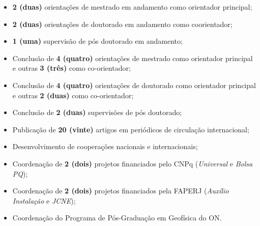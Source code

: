 \begin{itemize}
	\item[\parbox{0.03\textwidth}{\vspace{-0.1\baselineskip}\faSeedling}]
	\textbf{2 (duas)} orientações de mestrado em andamento como orientador principal;
	\item[\parbox{0.03\textwidth}{\vspace{-0.1\baselineskip}\faSeedling}]
	\textbf{2 (duas)} orientações de doutorado em andamento como coorientador;
	\item[\parbox{0.03\textwidth}{\vspace{-0.1\baselineskip}\faSeedling}]
	\textbf{1 (uma)} supervisão de pós doutorado em andamento;
	\item[\parbox{0.03\textwidth}{\vspace{-0.1\baselineskip}\faBaby}]
	Conclusão de \textbf{4 (quatro)} orientações de mestrado como orientador principal e outras \textbf{3 (três)} como co-orientador;
	\item[\parbox{0.03\textwidth}{\vspace{-0.1\baselineskip}\faChild}]
	Conclusão de \textbf{4 (quatro)} orientações de doutorado como orientador principal e outras \textbf{2 (duas)} como co-orientador;
	\item[\parbox{0.025\textwidth}{\vspace{-0.1\baselineskip}\faMale}]
	Conclusão de \textbf{2 (duas)} supervisões de pós doutorado;
	\item[\parbox{0.03\textwidth}{\vspace{-0.1\baselineskip}\faPencil*}]
	Publicação de \textbf{20 (vinte)} artigos em periódicos de circulação internacional;
	\item[\parbox{0.03\textwidth}{\vspace{-0.1\baselineskip}\faPeopleCarry}]
	Desenvolvimento de cooperações nacionais e internacionais;
	\item[\parbox{0.03\textwidth}{\vspace{-0.1\baselineskip}\aiIDEASRePEc}] 
	Coordenação de \textbf{2 (dois)} projetos financiados pelo CNPq
	(\textit{Universal} e \textit{Bolsa PQ});
	\item[\parbox{0.03\textwidth}{\vspace{-0.1\baselineskip}\aiIDEASRePEc}]
	Coordenação de \textbf{2 (dois)} projetos financiados pela FAPERJ
	(\textit{Auxílio Instalação} e \textit{JCNE});
	\item[\parbox{0.03\textwidth}{\vspace{-0.1\baselineskip}\faBomb}]
	Coordenação do Programa de Pós-Graduação em Geofísica do ON.

\end{itemize}
